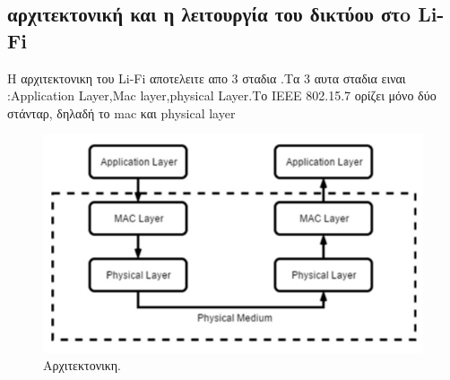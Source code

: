 \documentclass[conference]{IEEEtran}
\begin{document}
\subsection{αρχιτεκτονική και η λειτουργία του δικτύου στo Li-Fi \cite{b9} }
Η αρχιτεκτονικη του Li-Fi αποτελειτε απο 3 σταδια .Τα 3 αυτα σταδια ειναι :Application Layer,Mac layer,physical Layer.Το IEEE 802.15.7 ορίζει μόνο δύο στάνταρ, δηλαδή το mac και physical layer  
\begin{figure}[h]
  \includegraphics[width=\linewidth]{9.png}
  \caption{Αρχιτεκτονικη.} 
\end{figure}
\end{document}

